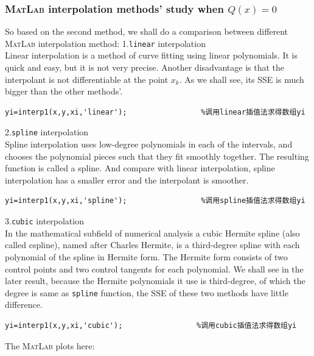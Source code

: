 \documentclass[a4paper]{article}
\begin{document}
\subsubsection{\textsc{MatLab} interpolation methods' study when $Q(x)=0$}
So based on the second method, we shall do a comparison between different \textsc{MatLab} interpolation method:
1.\verb$linear$ interpolation\\
Linear interpolation is a method of curve fitting using linear polynomials. It is quick and easy, but it is not very precise. Another disadvantage is that the interpolant is not differentiable at the point ${x_k}$. As we shall see, its SSE is much bigger than the other methods'.
\begin{verbatim}
yi=interp1(x,y,xi,'linear');                 %调用linear插值法求得数组yi
\end{verbatim}
2.\verb$spline$ interpolation\\
Spline interpolation uses low-degree polynomials in each of the intervals, and chooses the polynomial pieces such that they fit smoothly together. The resulting function is called a spline. And compare with linear interpolation, spline interpolation has a smaller error and the interpolant is smoother.
\begin{verbatim}
yi=interp1(x,y,xi,'spline');                 %调用spline插值法求得数组yi
\end{verbatim}
3.\verb$cubic$ interpolation\\
In the mathematical subfield of numerical analysis a cubic Hermite spline (also called cspline), named after Charles Hermite, is a third-degree spline with each polynomial of the spline in Hermite form. The Hermite form consists of two control points and two control tangents for each polynomial. We shall see in the later result, because the Hermite polynomials it use is third-degree, of which the degree is same as \verb$spline$ function, the SSE of these two methods have little difference.
\begin{verbatim}
yi=interp1(x,y,xi,'cubic');                 %调用cubic插值法求得数组yi
\end{verbatim}
The \textsc{MatLab} plots here:
\end{document}
